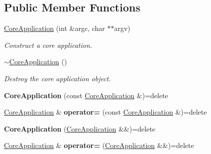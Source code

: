 \subsection*{Public Member Functions}
\begin{DoxyCompactItemize}
\item 
\hyperlink{class_mdt_1_1_core_application_a1f9e0cee5d94ec783ea49ec57030bce9}{Core\+Application} (int \&argc, char $\ast$$\ast$argv)
\begin{DoxyCompactList}\small\item\em Construct a core application. \end{DoxyCompactList}\item 
\hyperlink{class_mdt_1_1_core_application_ac91f0fe77618f10cbdf1f5594c2a82ea}{$\sim$\+Core\+Application} ()
\begin{DoxyCompactList}\small\item\em Destroy the core application object. \end{DoxyCompactList}\item 
{\bfseries Core\+Application} (const \hyperlink{class_mdt_1_1_core_application}{Core\+Application} \&)=delete\hypertarget{class_mdt_1_1_core_application_a62325e06671365f59e2e665d154c7980}{}\label{class_mdt_1_1_core_application_a62325e06671365f59e2e665d154c7980}

\item 
\hyperlink{class_mdt_1_1_core_application}{Core\+Application} \& {\bfseries operator=} (const \hyperlink{class_mdt_1_1_core_application}{Core\+Application} \&)=delete\hypertarget{class_mdt_1_1_core_application_a7d289e822b3b564ec1be514f1abe8634}{}\label{class_mdt_1_1_core_application_a7d289e822b3b564ec1be514f1abe8634}

\item 
{\bfseries Core\+Application} (\hyperlink{class_mdt_1_1_core_application}{Core\+Application} \&\&)=delete\hypertarget{class_mdt_1_1_core_application_add05d6ef32f7eaf59573a1d5a1a3e488}{}\label{class_mdt_1_1_core_application_add05d6ef32f7eaf59573a1d5a1a3e488}

\item 
\hyperlink{class_mdt_1_1_core_application}{Core\+Application} \& {\bfseries operator=} (\hyperlink{class_mdt_1_1_core_application}{Core\+Application} \&\&)=delete\hypertarget{class_mdt_1_1_core_application_aceac66ce619e99eba6fbf1039da9a009}{}\label{class_mdt_1_1_core_application_aceac66ce619e99eba6fbf1039da9a009}


\end{DoxyCompactItemize}
